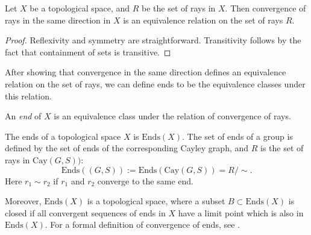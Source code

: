 \begin{proposition}
    Let \(X\) be a topological space, and \(R\) be the set of rays in \(X\). Then convergence of rays in the same direction in \(X\) is an equivalence relation on the set of rays \(R\).
\end{proposition}

\begin{proof}
    Reflexivity and symmetry are straightforward. Transitivity follows by the fact that containment of sets is transitive.
\end{proof}

After showing that convergence in the same direction defines an equivalence relation on the set of rays, we can define ends to be the equivalence classes under this relation.
\begin{definition}
    An \emph{end} of \(X\) is an equivalence class under the relation of convergence of rays.  
\end{definition}

\begin{definition}
    The ends of a topological space \(X\) is \(\mathrm{Ends}(X)\). The set of ends of a group is defined by the set of ends of the corresponding Cayley graph, and \(R\) is the set of rays in \(\mathrm{Cay}(G,S))\):
    \[
        \mathrm{Ends}((G,S)) := \mathrm{Ends}(\mathrm{Cay}(G,S)) = R/\sim.
    \]
    Here \(r_1 \sim r_2\) if \(r_1\) and \(r_2\) converge to the same end.
\end{definition}

Moreover, \(\mathrm{Ends}(X)\) is a topological space, where a subset \(B \subset \mathrm{Ends}(X)\) is closed if all convergent sequences of ends in \(X\) have a limit point which is also in \(\mathrm{Ends}(X)\). For a formal definition of convergence of ends, see \cite[p.~144]{bridson_haefliger_metric_1999}.

\begin{comment}
Let \(E(r)\) be the equivalence class of \(r \in R\). For a sequence of rays \(\{r_n\}_{n \in \mathbb{N}} \in R\), convergence \(E(r_n) \to E(r)\) as \(n\) tends to infinity is defined by the following condition: for every compact set \(C \in X\), there exists a sequence of integers \(N_n\) such that \(r_n[N_n, \infty]\) and \(r[N_n, \infty]\) lie in the same path component of \(X \setminus C\) whenever \(n\) is sufficiently large. A subset \(B \subset \mathrm{Ends}(X)\) is defined to be closed if the following holds: if \(E(r_n) \in B\) for all \(n \in \mathbb{N}\), then \(E(r_n) \to E(r)\) implies \(E(r) \in B\).
\end{comment}

